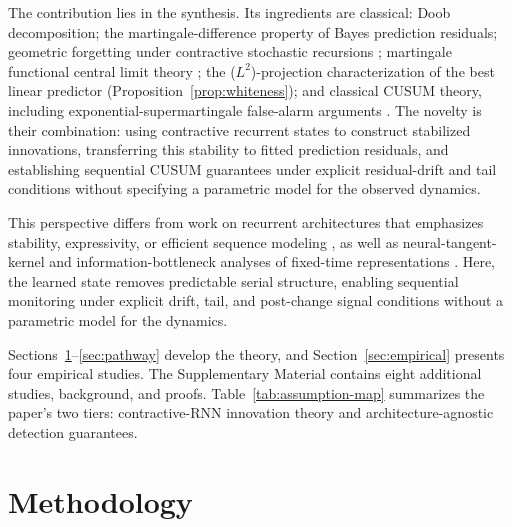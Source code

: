 \documentclass[bj,authoryear]{imsart}
\theoremstyle{plain}
\theoremstyle{definition}
\begin{document}
The contribution lies in the synthesis. Its ingredients are classical: Doob decomposition; the martingale-difference property of Bayes prediction residuals; geometric forgetting under contractive stochastic recursions \citep{doukhan1994mixing,miller2019stable}; martingale functional central limit theory \citep{hall1980martingale,billingsley1999convergence}; the ($L^2$)-projection characterization of the best linear predictor (Proposition~\ref{prop:whiteness}); and classical CUSUM theory, including exponential-supermartingale false-alarm arguments \citep{page1954continuous,lorden1971procedures}. The novelty is their combination: using contractive recurrent states to construct stabilized innovations, transferring this stability to fitted prediction residuals, and establishing sequential CUSUM guarantees under explicit residual-drift and tail conditions without specifying a parametric model for the observed dynamics.

This perspective differs from work on recurrent architectures that emphasizes stability, expressivity, or efficient sequence modeling \citep{miller2019stable,miyato2018spectral,gonon2020reservoir,gu2021efficiently,gu2023mamba,orvieto2023resurrecting}, as well as neural-tangent-kernel and information-bottleneck analyses of fixed-time representations \citep{jacot2018neural,tishby2015deep,saxe2019information}. Here, the learned state removes predictable serial structure, enabling sequential monitoring under explicit drift, tail, and post-change signal conditions without a parametric model for the dynamics.

Sections~\ref{sec:theory}--\ref{sec:pathway} develop the theory, and Section~\ref{sec:empirical} presents four empirical studies. The Supplementary Material contains eight additional studies, background, and proofs. Table~\ref{tab:assumption-map} summarizes the paper’s two tiers: contractive-RNN innovation theory and architecture-agnostic detection guarantees.

\section{Methodology}
\label{sec:theory}

\end{document}
